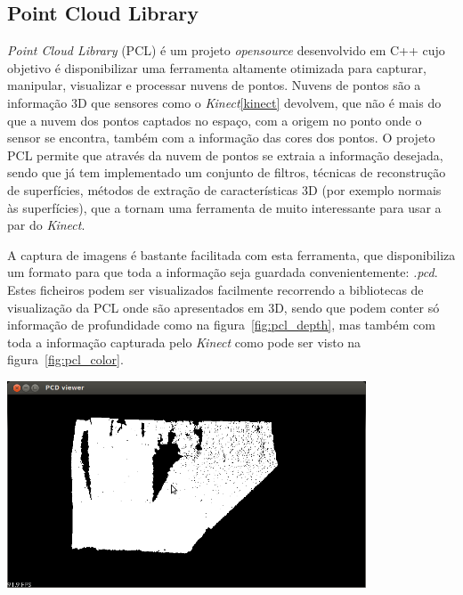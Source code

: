 \subsection[PCL]{Point Cloud Library}

\emph{Point Cloud Library} (PCL) é um projeto \emph{opensource} desenvolvido em C++ cujo objetivo é disponibilizar uma ferramenta altamente otimizada para capturar, manipular, visualizar e processar nuvens de pontos. Nuvens de pontos são a informação 3D que sensores como o \emph{Kinect}\ref{kinect} devolvem, que não é mais do que a nuvem dos pontos captados no espaço, com a origem no ponto onde o sensor se encontra, também com a informação das cores dos pontos.
O projeto PCL \cite{Rusu_ICRA2011_PCL} permite que através da nuvem de pontos se extraia a informação desejada, sendo que já tem implementado um conjunto de filtros, técnicas de reconstrução de superfícies, métodos de extração de características 3D (por exemplo normais às superfícies), que a tornam uma ferramenta de muito interessante para usar a par do \emph{Kinect}.

A captura de imagens é bastante facilitada com esta ferramenta, que disponibiliza um formato para que toda a informação seja guardada convenientemente: \emph{.pcd}. Estes ficheiros podem ser visualizados facilmente recorrendo a bibliotecas de visualização da PCL onde são apresentados em 3D, sendo que podem conter só informação de profundidade como na figura~\ref{fig:pcl_depth}, mas também com toda a informação capturada pelo \emph{Kinect} como pode ser visto na figura~\ref{fig:pcl_color}.

\begin{center}
	\includegraphics[width=0.80\textwidth]{figures/pcl_openni.png}
	\label{fig:pcl_depth}
	
\end{center}

